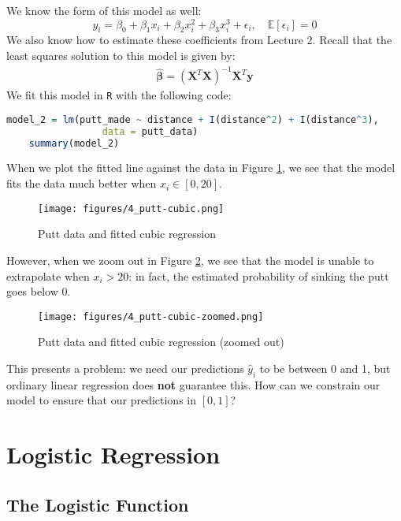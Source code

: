 \documentclass[twoside]{article}
\theoremstyle{definition}
\begin{document}
We know the form of this model as well:
\begin{equation}
    y_i = \beta_0 + \beta_1 x_i + \beta_2 x_i^2 + \beta_3 x_i^3 + \epsilon_i, \quad \mathbb{E}[\epsilon_i] = 0
\end{equation}
We also know how to estimate these coefficients from Lecture 2. Recall that the least squares solution to this model is given by:
\begin{align}
    \widehat{\boldsymbol{\beta}} = (\mathbf{X}^T \mathbf{X})^{-1} \mathbf{X}^T \mathbf{y}
\end{align}
We fit this model in \texttt{R} with the following code:
\begin{lstlisting}[language=R]
    model_2 = lm(putt_made ~ distance + I(distance^2) + I(distance^3),
                 data = putt_data)
    summary(model_2)
\end{lstlisting}
When we plot the fitted line against the data in Figure \ref{fig:putt-cubic}, we see that the model fits the data much better when $x_i \in [0, 20]$.
\begin{figure}[H]
    \centering
    \texttt{[image: figures/4\_putt-cubic.png]}
    \caption{Putt data and fitted cubic regression}
    \label{fig:putt-cubic}
\end{figure}
However, when we zoom out in Figure \ref{fig:putt-cubic-zoomed}, we see that the model is unable to extrapolate when $x_i > 20$: in fact, the estimated probability of sinking the putt goes below 0.
\begin{figure}[H]
    \centering
    \texttt{[image: figures/4\_putt-cubic-zoomed.png]}
    \caption{Putt data and fitted cubic regression (zoomed out)}
    \label{fig:putt-cubic-zoomed}
\end{figure}
This presents a problem: we need our predictions $\widehat{y}_i$ to be between 0 and 1, but ordinary linear regression does \textbf{not} guarantee this. How can we constrain our model to ensure that our predictions in $[0, 1]$?

\section{Logistic Regression}

\subsection{The Logistic Function}
\end{document}
